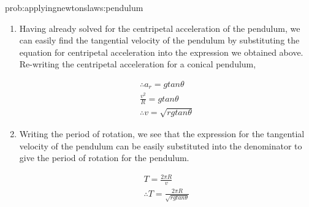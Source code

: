 \begin{solution}{prob:applyingnewtonslaws:pendulum}
\begin{enumerate}[label=\alph*)]
\item Having already solved for the centripetal acceleration of the pendulum, we can easily find the tangential velocity of the pendulum by substituting the equation for centripetal acceleration into the expression we obtained above. Re-writing the centripetal acceleration for a conical pendulum, 

\begin{align*}
\therefore a_r=gtan\theta \\
\frac{v^{2}}{R}=gtan\theta \\
\therefore v=\sqrt{rgtan\theta}
\end{align*}

\item Writing the period of rotation, we see that the expression for the tangential velocity of the pendulum can be easily substituted into the denominator to give the period of rotation for the pendulum.

\begin{align*}
T=\frac{2\pi R}{v} \\
\therefore T=\frac{2\pi R}{\sqrt{rgtan\theta }}
\end{align*}

\end{enumerate}
\end{solution}

